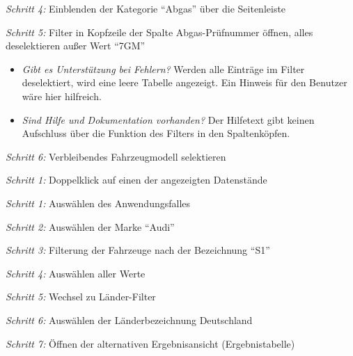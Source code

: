 \textit{Schritt 4:} Einblenden der Kategorie \enquote{Abgas} über die Seitenleiste\par
\textit{Schritt 5:} Filter in Kopfzeile der Spalte Abgas-Prüfnummer öffnen, alles deselektieren außer Wert \enquote{7GM}\par
\begin{itemize}
 \item \textit{Gibt es Unterstützung bei Fehlern?} Werden alle Einträge im Filter deselektiert, wird eine leere Tabelle angezeigt. Ein Hinweis für den Benutzer wäre hier hilfreich.\par
 \item \textit{Sind Hilfe und Dokumentation vorhanden?} Der Hilfetext gibt keinen Aufschluss über die Funktion des Filters in den Spaltenköpfen.\par
\end{itemize}
\textit{Schritt 6:} Verbleibendes Fahrzeugmodell selektieren \par
{}\par
\textit{Schritt 1:} Doppelklick auf einen der angezeigten Datenstände\par
{}\par
\textit{Schritt 1:} Auswählen des Anwendungsfalles\par
\textit{Schritt 2:} Auswählen der Marke \enquote{Audi}\par
\textit{Schritt 3:} Filterung der Fahrzeuge nach der Bezeichnung \enquote{S1}\par
\textit{Schritt 4:} Auswählen aller Werte\par
\textit{Schritt 5:} Wechsel zu Länder-Filter\par
\textit{Schritt 6:} Auswählen der Länderbezeichnung Deutschland\par
\textit{Schritt 7:} Öffnen der alternativen Ergebnisansicht (Ergebnistabelle)\par
